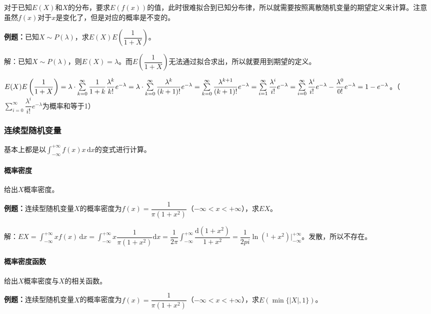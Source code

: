 对于已知$E(X)$和$X$的分布，要求$E(f(x))$的值，此时很难拟合到已知分布律，所以就需要按照离散随机变量的期望定义来计算。注意虽然$f(x)$对于$x$是变化了，但是对应的概率是不变的。

\textbf{例题：}已知$X\sim P(\lambda)$，求$E(X)E\left(\dfrac{1}{1+X}\right)$。

解：已知$X\sim P(\lambda)$，则$E(X)=\lambda$。而$E\left(\dfrac{1}{1+X}\right)$无法通过拟合求出，所以就要用到期望的定义。

$E(X)E\left(\dfrac{1}{1+X}\right)=\lambda\cdot\sum\limits_{k=0}^\infty\dfrac{1}{1+k}\dfrac{\lambda^k}{k!}e^{-\lambda}=\lambda\cdot\sum\limits_{k=0}^\infty\dfrac{\lambda^k}{(k+1)!}e^{-\lambda}=\sum\limits_{k=0}^\infty\dfrac{\lambda^{k+1}}{(k+1)!}e^{-\lambda}\\=\sum\limits_{i=1}^\infty\dfrac{\lambda^i}{i!}e^{-\lambda}=\sum\limits_{i=0}^\infty\dfrac{\lambda^i}{i!}e^{-\lambda}-\dfrac{\lambda^0}{0!}e^{-\lambda}=1-e^{-\lambda}$。（$\sum\limits_{i=0}^\infty\dfrac{\lambda^i}{i!}e^{-\lambda}$为概率和等于1）

\subsubsection{连续型随机变量}

基本上都是以$\int_{-\infty}^{+\infty}f(x)x\,\textrm{d}x$的变式进行计算。

\paragraph{概率密度} \leavevmode \medskip

给出$X$概率密度。

\textbf{例题：}连续型随机变量$X$的概率密度为$f(x)=\dfrac{1}{\pi(1+x^2)}$（$-\infty<x<+\infty$），求$EX$。

解：$EX=\int_{-\infty}^{+\infty}xf(x)\,\textrm{d}x=\int_{-\infty}^{+\infty}x\dfrac{1}{\pi(1+x^2)}\textrm{d}x=\dfrac{1}{2\pi}\int_{-\infty}^{+\infty}\dfrac{\textrm{d}(1+x^2)}{1+x^2}=\dfrac{1}{2pi}\ln(^1+x^2)|_{-\infty}^{+\infty}$。发散，所以不存在。

\paragraph{概率密度函数} \leavevmode \medskip

给出$X$概率密度与$X$的相关函数。

\textbf{例题：}连续型随机变量$X$的概率密度为$f(x)=\dfrac{1}{\pi(1+x^2)}$（$-\infty<x<+\infty$），求$E(\min\{\vert X\vert,1\})$。

